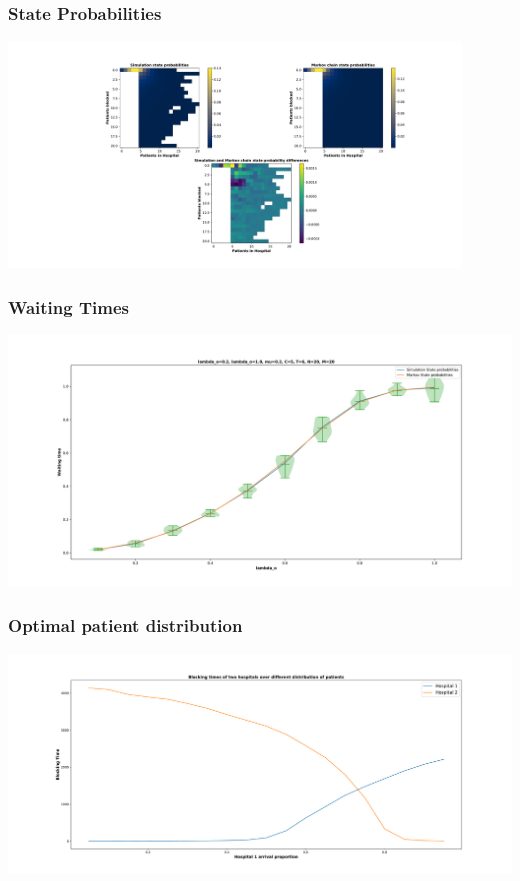 \begin{frame}
    \frametitle{State Probabilities}
    \centering
    \includegraphics[trim=850 350 180 70, clip, width=0.9\textwidth]{Bin/src/heatmap.pdf}
\end{frame}


\begin{frame}
    \frametitle{Waiting Times}
    \centering
    \includegraphics[trim=110 50 110 60, clip, width=\textwidth]{Bin/src/waiting_times.pdf}
\end{frame}


\begin{frame}
    \frametitle{Optimal patient distribution}
    \centering
    \includegraphics[trim=158 45 150 70, clip, width=\textwidth]{Bin/src/optimal_patient.pdf}
\end{frame}


